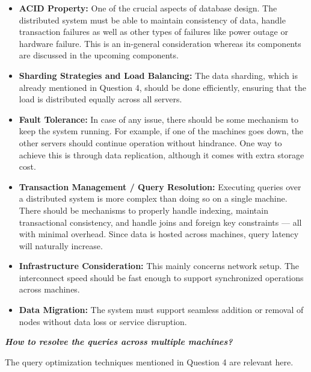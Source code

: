 \documentclass[a4paper, 12pt]{article}
\begin{document}
\begin{itemize}
    \item \textbf{ACID Property:} One of the crucial aspects of database design. The distributed system must be able to maintain consistency of data, handle transaction failures as well as other types of failures like power outage or hardware failure. This is an in-general consideration whereas its components are discussed in the upcoming components.

    \item \textbf{Sharding Strategies and Load Balancing:} The data sharding, which is already mentioned in Question 4, should be done efficiently, ensuring that the load is distributed equally across all servers.

    \item \textbf{Fault Tolerance:} In case of any issue, there should be some mechanism to keep the system running. For example, if one of the machines goes down, the other servers should continue operation without hindrance. One way to achieve this is through data replication, although it comes with extra storage cost.

    \item \textbf{Transaction Management / Query Resolution:} Executing queries over a distributed system is more complex than doing so on a single machine. There should be mechanisms to properly handle indexing, maintain transactional consistency, and handle joins and foreign key constraints — all with minimal overhead. Since data is hosted across machines, query latency will naturally increase.

    \item \textbf{Infrastructure Consideration:} This mainly concerns network setup. The interconnect speed should be fast enough to support synchronized operations across machines.

    \item \textbf{Data Migration:} The system must support seamless addition or removal of nodes without data loss or service disruption.
\end{itemize}

\vspace{1em}
\textbf{\textit{How to resolve the queries across multiple machines?}}

\vspace{1em}
The query optimization techniques mentioned in Question 4 are relevant here.
\end{document}
